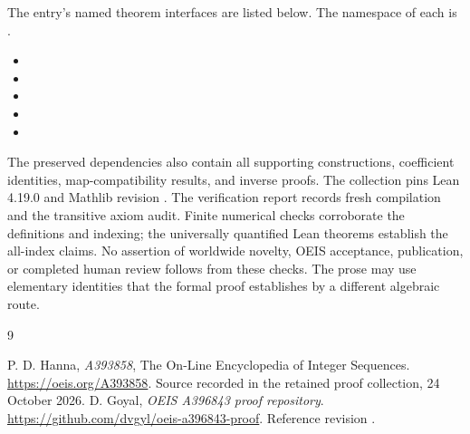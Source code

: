 \documentclass[11pt,a4paper]{article}
\theoremstyle{remark}\newtheorem{remark}[theorem]{Remark}
\begin{document}
The entry's named theorem interfaces are listed below. The namespace of
each is .
\begin{itemize}[leftmargin=1.5em,itemsep=1pt]
\item {}
\item {}
\item {}
\item {}
\item {}
\end{itemize}
The preserved dependencies also contain all supporting constructions,
coefficient identities, map-compatibility results, and inverse proofs.
The collection pins Lean 4.19.0 and Mathlib revision
.
The verification report records fresh compilation and the transitive axiom
audit. Finite numerical checks corroborate the definitions and indexing;
the universally quantified Lean theorems establish the all-index claims.
No assertion of worldwide novelty, OEIS acceptance, publication, or completed
human review follows from these checks. The prose may use elementary
identities that the formal proof establishes by a different algebraic route.

\begin{thebibliography}{9}\raggedright
{} P. D. Hanna, \emph{A393858}, The On-Line Encyclopedia of Integer
Sequences. \url{https://oeis.org/A393858}. Source recorded in the retained
proof collection, 24 October 2026.
 D. Goyal, \emph{OEIS A396843 proof repository}.
\url{https://github.com/dvgyl/oeis-a396843-proof}.
Reference revision .
\end{thebibliography}
\end{document}
